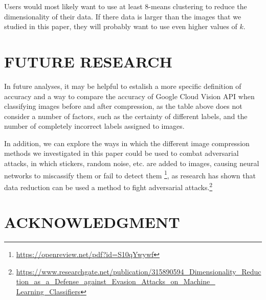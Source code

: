 \documentclass[letterpaper, 10 pt, conference]{ieeeconf}  %
\begin{document}
Users would most likely want to use at least 8-means clustering
to reduce the dimensionality of their data.
If there data is larger than the images that we studied in this paper,
they will probably want to use even higher values of $k$.

\section{FUTURE RESEARCH}

In future analyses, it may be helpful to estalish a more
specific definition of accuracy and a way to compare
the accuracy of Google Cloud Vision API when classifying
images before and after compression, as the table
above does not consider a number of factors, such as
the certainty of different labels, and the number
of completely incorrect labels assigned to images.

In addition, we can explore the ways in which the different
image compression methods we investigated in this paper
could be used to combat adversarial attacks, in which
stickers, random noise, etc. are added to images, causing
neural networks to miscassify them or fail to detect them
\footnote{\url{https://openreview.net/pdf?id=S10qYwywf}},
as research has shown that data reduction can be used a method to fight
adversarial attacks.\footnote{\url{https://www.researchgate.net/publication/315890594\_Dimensionality\_Reduction\_as\_a\_Defense\_against\_Evasion\_Attacks\_on\_Machine\_ Learning\_Classifiers}}


\addtolength{\textheight}{-12cm}   %


\section*{ACKNOWLEDGMENT}
\end{document}
